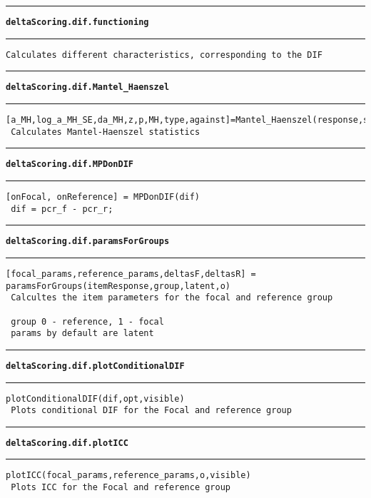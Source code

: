 \par\noindent\rule{\textwidth}{0.4pt}
{\bf\tt deltaScoring.dif.functioning}
\par\noindent\rule{\textwidth}{0.4pt}
\begin{lstlisting}[style=Matlab-bw]
 Calculates different characteristics, corresponding to the DIF
\end{lstlisting}
\par\noindent\rule{\textwidth}{0.4pt}
{\bf\tt deltaScoring.dif.Mantel\_Haenszel}
\par\noindent\rule{\textwidth}{0.4pt}
\begin{lstlisting}[style=Matlab-bw]
 [a_MH,log_a_MH_SE,da_MH,z,p,MH,type,against]=Mantel_Haenszel(response,score,groups,reference)
 Calculates Mantel-Haenszel statistics
\end{lstlisting}
\par\noindent\rule{\textwidth}{0.4pt}
{\bf\tt deltaScoring.dif.MPDonDIF}
\par\noindent\rule{\textwidth}{0.4pt}
\begin{lstlisting}[style=Matlab-bw]
 [onFocal, onReference] = MPDonDIF(dif)
 dif = pcr_f - pcr_r;
\end{lstlisting}
\par\noindent\rule{\textwidth}{0.4pt}
{\bf\tt deltaScoring.dif.paramsForGroups}
\par\noindent\rule{\textwidth}{0.4pt}
\begin{lstlisting}[style=Matlab-bw]
 [focal_params,reference_params,deltasF,deltasR] = paramsForGroups(itemResponse,group,latent,o)
 Calcultes the item parameters for the focal and reference group

 group 0 - reference, 1 - focal
 params by default are latent
\end{lstlisting}
\par\noindent\rule{\textwidth}{0.4pt}
{\bf\tt deltaScoring.dif.plotConditionalDIF}
\par\noindent\rule{\textwidth}{0.4pt}
\begin{lstlisting}[style=Matlab-bw]
 plotConditionalDIF(dif,opt,visible)
 Plots conditional DIF for the Focal and reference group
\end{lstlisting}
\par\noindent\rule{\textwidth}{0.4pt}
{\bf\tt deltaScoring.dif.plotICC}
\par\noindent\rule{\textwidth}{0.4pt}
\begin{lstlisting}[style=Matlab-bw]
 plotICC(focal_params,reference_params,o,visible)
 Plots ICC for the Focal and reference group
\end{lstlisting}
